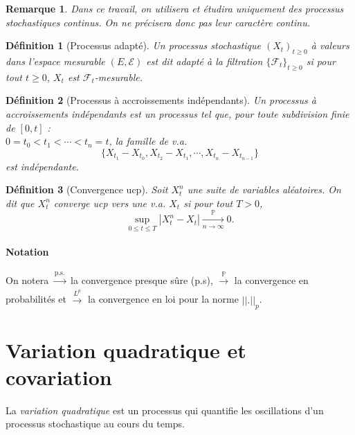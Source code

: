 \documentclass[openany]{book}
\newcommand{\F}{\mathscr{F}}
\newcommand{\carE}{\mathscr{E}}
\renewcommand{\P}{\mathds{P}}
\newcommand{\1}{\mathbbm{1}}
\theoremstyle{thmfont}
\theoremstyle{deffont}
\newtheorem{definition}[definition]{Définition}
\theoremstyle{thmfont}
\theoremstyle{deffont}
\newtheorem{remark}[remark]{Remarque}
\begin{document}
\begin{remark} Dans ce travail, on utilisera et étudira uniquement des processus stochastiques continus. On ne précisera donc pas leur caractère continu.
\end{remark}

\begin{definition}[Processus adapté] Un processus stochastique $(X_t)_{t\ge0}$ à valeurs dans l'espace mesurable $(E, \carE)$ est dit \textit{adapté} à la filtration $\{\F_t\}_{t\geq0}$ si pour tout $t\geq0$, $X_t$ est $\F_t$-mesurable.
\label{def:pr_adapte}
\end{definition}
  

\begin{definition}[Processus à accroissements indépendants]
  \label{def:pr_accr_indep} Un processus à \textit{accroissements indépendants} est un processus tel que, pour toute subdivision finie de $[0,t]$ :\\  $0 = t_0 < t_1 < \cdots < t_n = t$, la famille de v.a.
    $$\{X_{t_1} - X_{t_0}, X_{t_2} - X_{t_1}, \cdots ,X_{t_n} - X_{t_{n-1}}\}$$
    est indépendante.
  \end{definition}

  {
    \color{red}
    \begin{definition}[Convergence ucp] Soit $X_t^n$ une suite de variables aléatoires. On dit que $X_t^n$ \textit{converge ucp} vers une v.a. $X_t$ si pour tout $T >0$, 
      $$\underset{0 \leq t \leq T}{\sup}|X_t^n - X_t| \xrightarrow[n \to \infty]{\P} 0.$$
    \end{definition}

    \paragraph{Notation}
    On notera $\xrightarrow[]{\text{p.s.}}$ la convergence presque sûre (p.s), $\xrightarrow[]{\P}$ la convergence en probabilités et $\xrightarrow[]{L^p}$ la convergence en loi pour la norme $||.||_p$.
    
  }
\section{Variation quadratique et covariation}

La \textit{variation quadratique} est un processus qui quantifie les oscillations d'un processus stochastique au cours du temps. %
\end{document}
